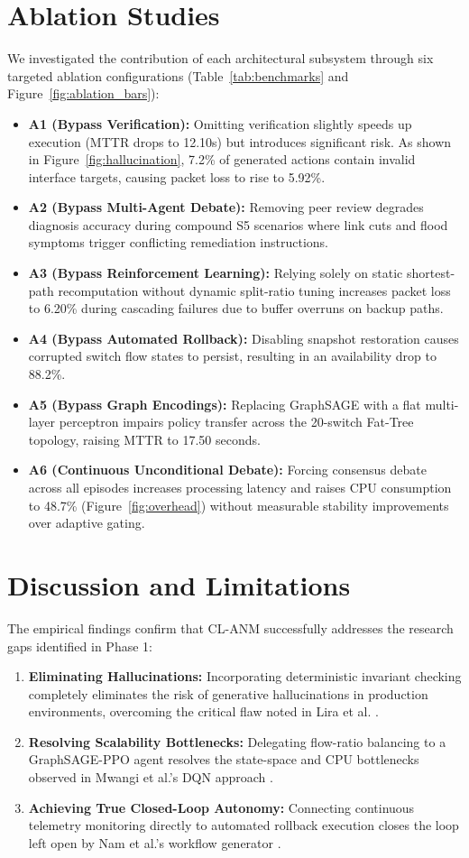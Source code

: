 \documentclass[10pt,twocolumn,a4paper]{article}
\begin{document}
\section{Ablation Studies}
We investigated the contribution of each architectural subsystem through six targeted ablation configurations (Table~\ref{tab:benchmarks} and Figure~\ref{fig:ablation_bars}):
\begin{itemize}
    \item \textbf{A1 (Bypass Verification):} Omitting verification slightly speeds up execution (MTTR drops to 12.10s) but introduces significant risk. As shown in Figure~\ref{fig:hallucination}, 7.2\% of generated actions contain invalid interface targets, causing packet loss to rise to 5.92\%.
    \item \textbf{A2 (Bypass Multi-Agent Debate):} Removing peer review degrades diagnosis accuracy during compound S5 scenarios where link cuts and flood symptoms trigger conflicting remediation instructions.
    \item \textbf{A3 (Bypass Reinforcement Learning):} Relying solely on static shortest-path recomputation without dynamic split-ratio tuning increases packet loss to 6.20\% during cascading failures due to buffer overruns on backup paths.
    \item \textbf{A4 (Bypass Automated Rollback):} Disabling snapshot restoration causes corrupted switch flow states to persist, resulting in an availability drop to 88.2\%.
    \item \textbf{A5 (Bypass Graph Encodings):} Replacing GraphSAGE with a flat multi-layer perceptron impairs policy transfer across the 20-switch Fat-Tree topology, raising MTTR to 17.50 seconds.
    \item \textbf{A6 (Continuous Unconditional Debate):} Forcing consensus debate across all episodes increases processing latency and raises CPU consumption to 48.7\% (Figure~\ref{fig:overhead}) without measurable stability improvements over adaptive gating.
\end{itemize}

\section{Discussion and Limitations}
The empirical findings confirm that CL-ANM successfully addresses the research gaps identified in Phase 1:
\begin{enumerate}
    \item \textbf{Eliminating Hallucinations:} Incorporating deterministic invariant checking completely eliminates the risk of generative hallucinations in production environments, overcoming the critical flaw noted in Lira et al. \cite{lira2026}.
    \item \textbf{Resolving Scalability Bottlenecks:} Delegating flow-ratio balancing to a GraphSAGE-PPO agent resolves the state-space and CPU bottlenecks observed in Mwangi et al.'s DQN approach \cite{mwangi2026}.
    \item \textbf{Achieving True Closed-Loop Autonomy:} Connecting continuous telemetry monitoring directly to automated rollback execution closes the loop left open by Nam et al.'s workflow generator \cite{nam2026}.
\end{enumerate}
\end{document}

